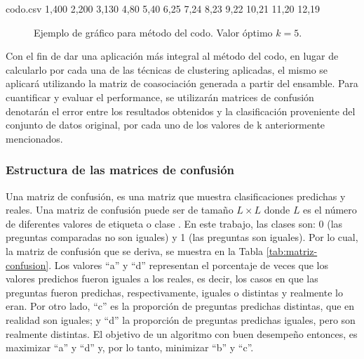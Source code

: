 \begin{filecontents*}{codo.csv}
1,400
2,200
3,130
4,80
5,40
6,25
7,24
8,23
9,22
10,21
11,20
12,19
\end{filecontents*}

\begin{figure}
	\centering
	\scriptsize
	\caption{Ejemplo de gráfico para método del codo. Valor óptimo \(k = 5\).}
	\label{fig:codo}
\end{figure}

\bigskip Con el fin de dar una aplicación más integral al método del codo, en lugar de calcularlo por cada una de las técnicas de clustering aplicadas, el mismo se aplicará utilizando la matriz de coasociación generada a partir del ensamble. Para cuantificar y evaluar el performance, se utilizarán matrices de confusión denotarán el error entre los resultados obtenidos y la clasificación proveniente del conjunto de datos original, por cada uno de los valores de k anteriormente mencionados.

\subsubsection{Estructura de las matrices de confusión}
Una matriz de confusión, es una matriz que muestra clasificaciones predichas y reales. Una matriz de confusión puede ser de tamaño \(L \times L\) donde \(L\) es el número de diferentes valores de etiqueta o clase \citep{provost1998glossary}. En este trabajo, las clases son: 0 (las preguntas comparadas no son iguales) y 1 (las preguntas son iguales). Por lo cual, la matriz de confusión que se deriva, se muestra en la Tabla \ref{tab:matriz-confusion}. Los valores “a” y “d” representan el porcentaje de veces que los valores predichos fueron iguales a los reales, es decir, los casos en que las preguntas fueron predichas, respectivamente, iguales o distintas y realmente lo eran. Por otro lado, “c” es la proporción de preguntas predichas distintas, que en realidad son iguales; y “d” la proporción de preguntas predichas iguales, pero son realmente distintas. El objetivo de un algoritmo con buen desempeño entonces, es maximizar “a” y “d” y, por lo tanto, minimizar “b” y “c”.


